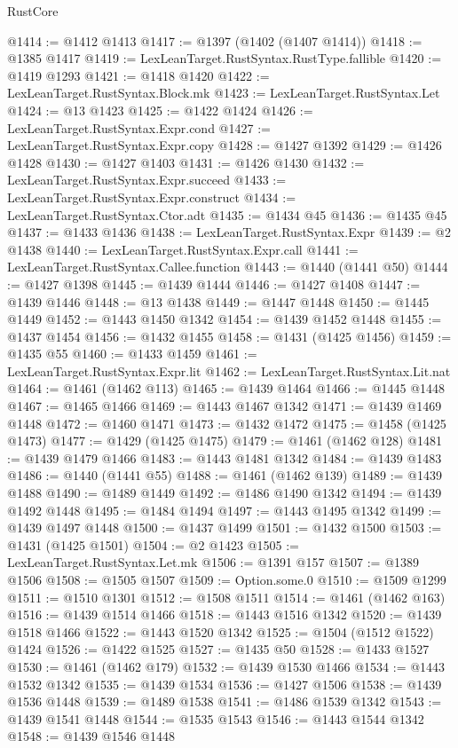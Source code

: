\begin{lexlean}{RustCore}
\begin{coremodule}
@1414 := @1412 @1413
@1417 := @1397 (@1402 (@1407 @1414))
@1418 := @1385 @1417
@1419 := LexLeanTarget.RustSyntax.RustType.fallible
@1420 := @1419 @1293
@1421 := @1418 @1420
@1422 := LexLeanTarget.RustSyntax.Block.mk
@1423 := LexLeanTarget.RustSyntax.Let
@1424 := @13 @1423
@1425 := @1422 @1424
@1426 := LexLeanTarget.RustSyntax.Expr.cond
@1427 := LexLeanTarget.RustSyntax.Expr.copy
@1428 := @1427 @1392
@1429 := @1426 @1428
@1430 := @1427 @1403
@1431 := @1426 @1430
@1432 := LexLeanTarget.RustSyntax.Expr.succeed
@1433 := LexLeanTarget.RustSyntax.Expr.construct
@1434 := LexLeanTarget.RustSyntax.Ctor.adt
@1435 := @1434 @45
@1436 := @1435 @45
@1437 := @1433 @1436
@1438 := LexLeanTarget.RustSyntax.Expr
@1439 := @2 @1438
@1440 := LexLeanTarget.RustSyntax.Expr.call
@1441 := LexLeanTarget.RustSyntax.Callee.function
@1443 := @1440 (@1441 @50)
@1444 := @1427 @1398
@1445 := @1439 @1444
@1446 := @1427 @1408
@1447 := @1439 @1446
@1448 := @13 @1438
@1449 := @1447 @1448
@1450 := @1445 @1449
@1452 := @1443 @1450 @1342
@1454 := @1439 @1452 @1448
@1455 := @1437 @1454
@1456 := @1432 @1455
@1458 := @1431 (@1425 @1456)
@1459 := @1435 @55
@1460 := @1433 @1459
@1461 := LexLeanTarget.RustSyntax.Expr.lit
@1462 := LexLeanTarget.RustSyntax.Lit.nat
@1464 := @1461 (@1462 @113)
@1465 := @1439 @1464
@1466 := @1445 @1448
@1467 := @1465 @1466
@1469 := @1443 @1467 @1342
@1471 := @1439 @1469 @1448
@1472 := @1460 @1471
@1473 := @1432 @1472
@1475 := @1458 (@1425 @1473)
@1477 := @1429 (@1425 @1475)
@1479 := @1461 (@1462 @128)
@1481 := @1439 @1479 @1466
@1483 := @1443 @1481 @1342
@1484 := @1439 @1483
@1486 := @1440 (@1441 @55)
@1488 := @1461 (@1462 @139)
@1489 := @1439 @1488
@1490 := @1489 @1449
@1492 := @1486 @1490 @1342
@1494 := @1439 @1492 @1448
@1495 := @1484 @1494
@1497 := @1443 @1495 @1342
@1499 := @1439 @1497 @1448
@1500 := @1437 @1499
@1501 := @1432 @1500
@1503 := @1431 (@1425 @1501)
@1504 := @2 @1423
@1505 := LexLeanTarget.RustSyntax.Let.mk
@1506 := @1391 @157
@1507 := @1389 @1506
@1508 := @1505 @1507
@1509 := Option.some.{0}
@1510 := @1509 @1299
@1511 := @1510 @1301
@1512 := @1508 @1511
@1514 := @1461 (@1462 @163)
@1516 := @1439 @1514 @1466
@1518 := @1443 @1516 @1342
@1520 := @1439 @1518 @1466
@1522 := @1443 @1520 @1342
@1525 := @1504 (@1512 @1522) @1424
@1526 := @1422 @1525
@1527 := @1435 @50
@1528 := @1433 @1527
@1530 := @1461 (@1462 @179)
@1532 := @1439 @1530 @1466
@1534 := @1443 @1532 @1342
@1535 := @1439 @1534
@1536 := @1427 @1506
@1538 := @1439 @1536 @1448
@1539 := @1489 @1538
@1541 := @1486 @1539 @1342
@1543 := @1439 @1541 @1448
@1544 := @1535 @1543
@1546 := @1443 @1544 @1342
@1548 := @1439 @1546 @1448

\end{coremodule}
\end{lexlean}
